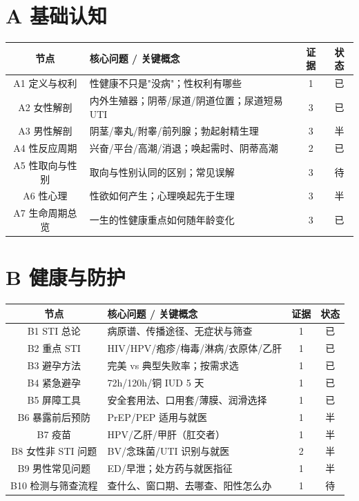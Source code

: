 \documentclass[12pt,UTF8,openany]{ctexbook}
\begin{document}
\section{A 基础认知}

\begin{tabularx}{\linewidth}{C X c c}
\toprule
\textbf{节点} & \textbf{核心问题 / 关键概念} & \textbf{证据} & \textbf{状态} \\
\midrule
A1 定义与权利 & 性健康不只是"没病"；性权利有哪些 & 1 & 已 \\
A2 女性解剖 & 内外生殖器；阴蒂/尿道/阴道位置；尿道短易 UTI & 3 & 已 \\
A3 男性解剖 & 阴茎/睾丸/附睾/前列腺；勃起射精生理 & 3 & 半 \\
A4 性反应周期 & 兴奋/平台/高潮/消退；唤起需时、阴蒂高潮 & 2 & 已 \\
A5 性取向与性别 & 取向与性别认同的区别；常见误解 & 3 & 待 \\
A6 性心理 & 性欲如何产生；心理唤起先于生理 & 3 & 半 \\
A7 生命周期总览 & 一生的性健康重点如何随年龄变化 & 3 & 已 \\
\bottomrule
\end{tabularx}

\section{B 健康与防护}

\begin{tabularx}{\linewidth}{C X c c}
\toprule
\textbf{节点} & \textbf{核心问题 / 关键概念} & \textbf{证据} & \textbf{状态} \\
\midrule
B1 STI 总论 & 病原谱、传播途径、无症状与筛查 & 1 & 已 \\
B2 重点 STI & HIV/HPV/疱疹/梅毒/淋病/衣原体/乙肝 & 1 & 已 \\
B3 避孕方法 & 完美 vs 典型失败率；按需求选 & 1 & 已 \\
B4 紧急避孕 & 72h/120h/铜 IUD 5 天 & 1 & 已 \\
B5 屏障工具 & 安全套用法、口用套/薄膜、润滑选择 & 1 & 已 \\
B6 暴露前后预防 & PrEP/PEP 适用与就医 & 1 & 半 \\
B7 疫苗 & HPV/乙肝/甲肝（肛交者） & 1 & 半 \\
B8 女性非 STI 问题 & BV/念珠菌/UTI 识别与就医 & 2 & 半 \\
B9 男性常见问题 & ED/早泄；处方药与就医指征 & 1 & 半 \\
B10 检测与筛查流程 & 查什么、窗口期、去哪查、阳性怎么办 & 1 & 待 \\
\bottomrule
\end{tabularx}
\end{document}
